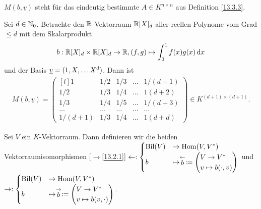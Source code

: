 \documentclass[../../main.tex]{subfiles}
\begin{document}
\begin{nt}\label{13.3.5}  
$M(b,\underline{v})$ steht für das eindeutig bestimmte $A\in K^{n\times n}$ aus Definition \ref{13.3.3}.
\end{nt}

\begin{bsp}\label{13.3.6}
Sei $d\in \mathbb N_0$. Betrachte den $\mathbb R$-Vektorraum $\mathbb R[X]_d$ aller reellen Polynome vom Grad $\le d$ mit dem Skalarprodukt
\begin{align*}
b: \mathbb R[X]_d\times \mathbb R[X]_d\to \mathbb R, (f,g)\mapsto \int_0^1 f(x)g(x)\,\text{d}x
\end{align*}
und der Basis ${\underline v}=(1,X,\ldots X^d)$. Dann ist
\begin{align*}
M(b,\underline{v})=\begin{pmatrix*}[l]
1& 1/2& 1/3&\ldots &1/(d+1)\\
1/2 &1/3& 1/4&\ldots &1(d+2)\\
1/3& 1/4& 1/5&\ldots &1/(d+3)\\
\ldots  &\ldots & \ldots &\ldots &\ldots \\
1/(d+1) &1/3& 1/4&\ldots &1(d+d)
\end{pmatrix*}\in K^{(d+1)\times(d+1)}.
\end{align*}
\end{bsp}
	
\begin{df}\label{13.3.7}
Sei $V$ ein $K$-Vektorraum. Dann definieren wir die beiden Vektorraumisomorphismen [$\to$\ref{13.2.1}] $\leftarrow: \begin{cases}\Bil(V)&\to\Hom(V,V^*)\\b&\mapsto \lvec b:=\begin{pmatrix*}[l]V\to V^*\\ v\mapsto b(\cdot, v)\end{pmatrix*}\end{cases}$ und\\ $\rightarrow: \begin{cases}\Bil(V)&\to\Hom(V,V^*)\\b&\mapsto \rvec b:=\begin{pmatrix*}[l]V\to V^*\\ v\mapsto b(v, \cdot)\end{pmatrix*}\end{cases}$.
\end{df}
\end{document}
